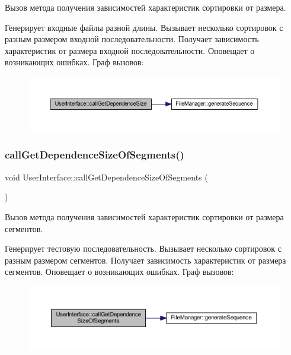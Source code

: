 Вызов метода получения зависимостей характеристик сортировки от размера. 

Генерирует входные файлы разной длины. Вызывает несколько сортировок с разным размером входной последовательности. Получает зависимость характеристик от размера входной последовательности. Оповещает о возникающих ошибках. Граф вызовов\+:\nopagebreak
\begin{figure}[H]
\begin{center}
\leavevmode
\includegraphics[width=350pt]{class_user_interface_a1dc307f92c919866f13ddaf30cde1a70_cgraph}
\end{center}
\end{figure}
\hypertarget{class_user_interface_ab668f3b2d9f89ce3eacda5e166f33807}{}\label{class_user_interface_ab668f3b2d9f89ce3eacda5e166f33807} 
\subsubsection{\texorpdfstring{call\+Get\+Dependence\+Size\+Of\+Segments()}{callGetDependenceSizeOfSegments()}}
{\footnotesize\ttfamily void User\+Interface\+::call\+Get\+Dependence\+Size\+Of\+Segments (\begin{DoxyParamCaption}{ }\end{DoxyParamCaption})\hspace{0.3cm}{\ttfamily [private]}}



Вызов метода получения зависимостей характеристик сортировки от размера сегментов. 

Генерирует тестовую последовательность. Вызывает несколько сортировок с разным размером сегментов. Получает зависимость характеристик от размера сегментов. Оповещает о возникающих ошибках. Граф вызовов\+:\nopagebreak
\begin{figure}[H]
\begin{center}
\leavevmode
\includegraphics[width=350pt]{class_user_interface_ab668f3b2d9f89ce3eacda5e166f33807_cgraph}
\end{center}
\end{figure}
\hypertarget{class_user_interface_aa413c00a65ae4faf9421e9fc359663ec}{}\label{class_user_interface_aa413c00a65ae4faf9421e9fc359663ec} 
